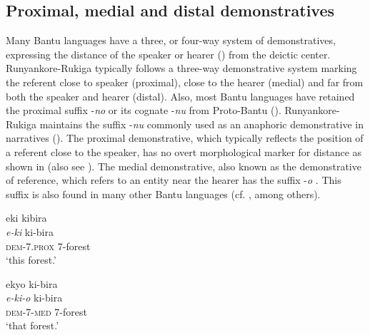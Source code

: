 \documentclass[output=paper 		  ]{langscibook}
\begin{document}
\subsection{Proximal, medial and distal demonstratives}\label{sec:asiimwe:2.2}

Many Bantu languages have a three, or four-way system of demonstratives, expressing the distance of the speaker or hearer (\citealt{Nicolle2012, VandeVelde2019}) from the deictic center. Run\-yan\-ko\-re-Ru\-ki\-ga typically follows a three-way demonstrative system marking the referent close to speaker (proximal), close to the hearer (medial) and far from both the speaker and hearer (distal). Also, most Bantu languages have retained the proximal suffix -\textit{no} or its cognate -\textit{nu} from Proto-Bantu (\citealt{AshtonEtAl1954, Nicolle2012, AhnvanderWal2019}). Run\-yan\-ko\-re-Ru\-ki\-ga maintains the suffix -\textit{nu} commonly used as an anaphoric demonstrative in narratives (). The proximal demonstrative, which typically reflects the position of a referent close to the speaker, has no overt morphological marker for distance as shown in  (also see ). The medial demonstrative, also known as the demonstrative of reference, which refers to an entity near the hearer has the suffix -\textit{o} . This suffix is also found in many other Bantu languages (cf. \citealt{AshtonEtAl1954, Nicolle2012,Nicolle2014, AhnvanderWal2019}, among others).

\ea%
    \label{ex:asiimwe:14}
    \ea\label{ex:asiimwe:14a}  eki kibira\\
    \gll \emph{e-ki}  ki-bira\\
    \textsc{dem}{}-7.\textsc{prox}  7-forest\\
  \glt ‘this forest.’

  \ex\label{ex:asiimwe:14b} ekyo ki-bira\\
    \gll \emph{e-ki-o}  ki-bira\\
    \textsc{dem}{}-7-\textsc{med}  7-forest\\
  \glt ‘that forest.’
    \z
\z
\end{document}
